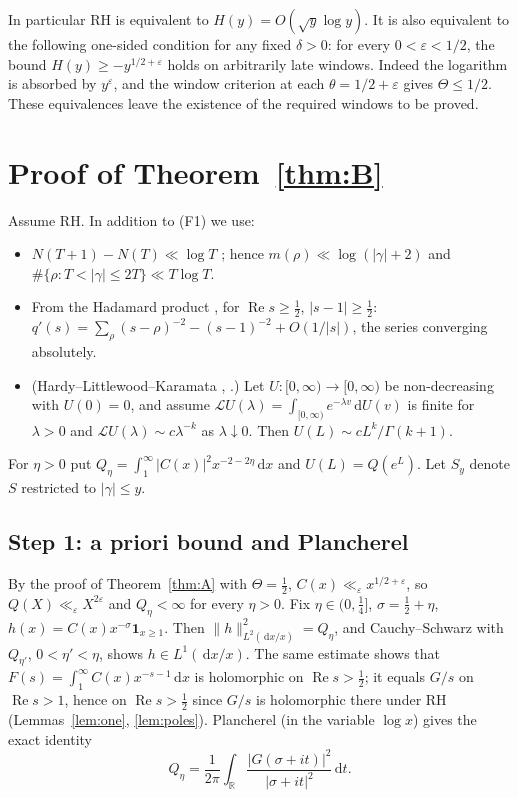 \documentclass[11pt]{amsart}
\theoremstyle{remark}
\theoremstyle{definition}
\newcommand{\dd}{\,\mathrm{d}}
\renewcommand{\Re}{\operatorname{Re}}
\begin{document}
In particular RH is equivalent to $H(y)=O(\sqrt y\log y)$.
It is also equivalent to the following one-sided condition for any fixed
$\delta>0$: for every $0<\varepsilon<1/2$, the bound
$H(y)\ge-y^{1/2+\varepsilon}$ holds on arbitrarily late windows.
Indeed the logarithm is absorbed by $y^\varepsilon$, and the window
criterion at each $\theta=1/2+\varepsilon$ gives $\Theta\le1/2$.
These equivalences leave the existence of the required windows to be proved.

\section{Proof of Theorem~\ref{thm:B}}\label{sec:B}

Assume RH. In addition to (F1) we use:
\begin{itemize}
\item[(F3)] $N(T+1)-N(T)\ll\log T$ \cite[Thm.~9.2]{Tit86}; hence $m(\rho)\ll\log(|\gamma|+2)$ and $\#\{\rho:T<|\gamma|\le2T\}\ll T\log T$.
\item[(F4)] From the Hadamard product \cite[Ch.~12]{Dav00}, for $\Re s\ge\frac12$, $|s-1|\ge\frac12$: $q'(s)=\sum_\rho(s-\rho)^{-2}-(s-1)^{-2}+O(1/|s|)$, the series converging absolutely.
\item[(F5)] (Hardy--Littlewood--Karamata \cite[Ch.~V]{Wid41}, \cite[Ch.~I]{Kor04}.) Let $U:[0,\infty)\to[0,\infty)$ be non-decreasing with $U(0)=0$, and assume $\mathcal LU(\lambda)=\int_{[0,\infty)}e^{-\lambda v}\dd U(v)$ is finite for $\lambda>0$ and $\mathcal LU(\lambda)\sim c\lambda^{-k}$ as $\lambda\downarrow0$. Then $U(L)\sim cL^k/\Gamma(k+1)$.
\end{itemize}

For $\eta>0$ put $Q_\eta=\int_1^\infty|C(x)|^2x^{-2-2\eta}\dd x$ and $U(L)=Q(e^L)$. Let $S_y$ denote $S$ restricted to $|\gamma|\le y$.

\subsection*{Step 1: a priori bound and Plancherel} By the proof of Theorem~\ref{thm:A} with $\Theta=\frac12$, $C(x)\ll_\varepsilon x^{1/2+\varepsilon}$, so $Q(X)\ll_\varepsilon X^{2\varepsilon}$ and $Q_\eta<\infty$ for every $\eta>0$. Fix $\eta\in(0,\frac14]$, $\sigma=\frac12+\eta$, $h(x)=C(x)x^{-\sigma}\mathbf 1_{x\ge1}$. Then $\|h\|^2_{L^2(\dd x/x)}=Q_\eta$, and Cauchy--Schwarz with $Q_{\eta'}$, $0<\eta'<\eta$, shows $h\in L^1(\dd x/x)$. The same estimate shows that $F(s)=\int_1^\infty C(x)x^{-s-1}\dd x$ is holomorphic on $\Re s>\frac12$; it equals $G/s$ on $\Re s>1$, hence on $\Re s>\frac12$ since $G/s$ is holomorphic there under RH (Lemmas~\ref{lem:one}, \ref{lem:poles}). Plancherel (in the variable $\log x$) gives the exact identity
\begin{equation}\label{eq:planch}
Q_\eta=\frac1{2\pi}\int_{\mathbb R}\frac{|G(\sigma+it)|^2}{|\sigma+it|^2}\dd t .
\end{equation}
\end{document}
